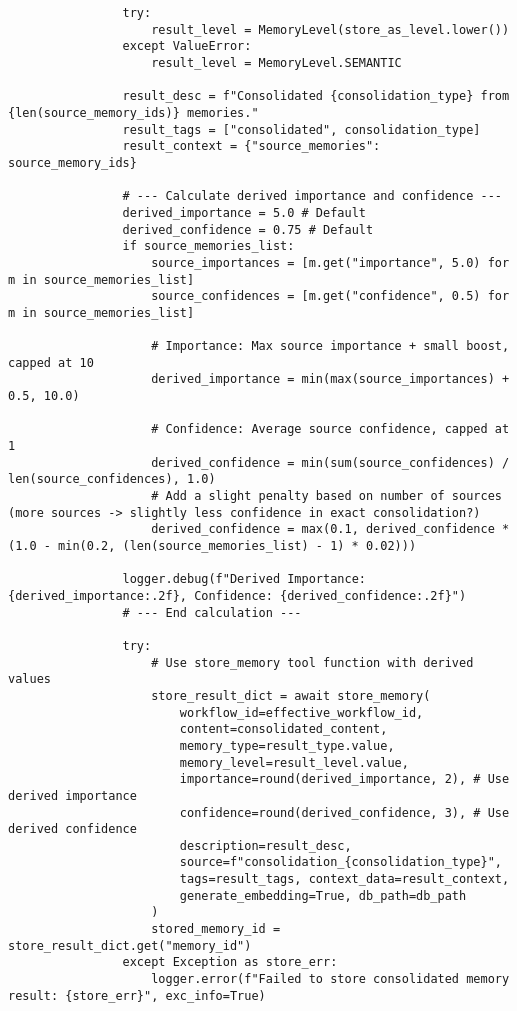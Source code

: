\documentclass[12pt,a4paper]{article}
\begin{document}
\begin{pageablecode}
\begin{verbatim}
                try: 
                    result_level = MemoryLevel(store_as_level.lower())
                except ValueError: 
                    result_level = MemoryLevel.SEMANTIC

                result_desc = f"Consolidated {consolidation_type} from {len(source_memory_ids)} memories."
                result_tags = ["consolidated", consolidation_type]
                result_context = {"source_memories": source_memory_ids}

                # --- Calculate derived importance and confidence ---
                derived_importance = 5.0 # Default
                derived_confidence = 0.75 # Default
                if source_memories_list:
                    source_importances = [m.get("importance", 5.0) for m in source_memories_list]
                    source_confidences = [m.get("confidence", 0.5) for m in source_memories_list]

                    # Importance: Max source importance + small boost, capped at 10
                    derived_importance = min(max(source_importances) + 0.5, 10.0)

                    # Confidence: Average source confidence, capped at 1
                    derived_confidence = min(sum(source_confidences) / len(source_confidences), 1.0)
                    # Add a slight penalty based on number of sources (more sources -> slightly less confidence in exact consolidation?)
                    derived_confidence = max(0.1, derived_confidence * (1.0 - min(0.2, (len(source_memories_list) - 1) * 0.02)))

                logger.debug(f"Derived Importance: {derived_importance:.2f}, Confidence: {derived_confidence:.2f}")
                # --- End calculation ---

                try:
                    # Use store_memory tool function with derived values
                    store_result_dict = await store_memory(
                        workflow_id=effective_workflow_id,
                        content=consolidated_content,
                        memory_type=result_type.value,
                        memory_level=result_level.value,
                        importance=round(derived_importance, 2), # Use derived importance
                        confidence=round(derived_confidence, 3), # Use derived confidence
                        description=result_desc,
                        source=f"consolidation_{consolidation_type}",
                        tags=result_tags, context_data=result_context,
                        generate_embedding=True, db_path=db_path
                    )
                    stored_memory_id = store_result_dict.get("memory_id")
                except Exception as store_err:
                    logger.error(f"Failed to store consolidated memory result: {store_err}", exc_info=True)


\end{verbatim}
\end{pageablecode}
\end{document}
